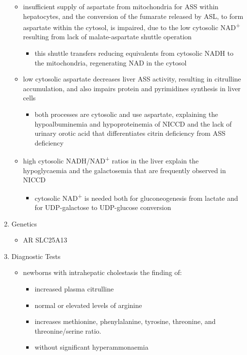 \documentclass[12pt]{scrartcl}
\begin{document}
\begin{center}
\begin{center}
\begin{enumerate}
\begin{itemize}
\item insufficient supply of aspartate from mitochondria for ASS within
hepatocytes, and the conversion of the fumarate released by ASL, to
form aspartate within the cytosol, is impaired, due to the low
cytosolic NAD\textsuperscript{+} resulting from lack of malate-aspartate shuttle
operation
\begin{itemize}
\item this shuttle transfers reducing equivalents from cytosolic NADH
to the mitochondria, regenerating NAD in the cytosol
\end{itemize}
\item low cytosolic aspartate decreases liver ASS activity, resulting in
citrulline accumulation, and also impairs protein and pyrimidines
synthesis in liver cells
\begin{itemize}
\item both processes are cytosolic and use aspartate, explaining the
hypoalbuminemia and hypoproteinemia of NICCD and the lack of
urinary orotic acid that differentiates citrin deficiency from
ASS deficiency
\end{itemize}
\item high cytosolic NADH/NAD\textsuperscript{+} ratios in the liver explain the
hypoglycaemia and the galactosemia that are frequently observed in
NICCD
\begin{itemize}
\item cytosolic NAD\textsuperscript{+} is needed both for gluconeogenesis from lactate and
for UDP-galactose to UDP-glucose conversion
\end{itemize}
\end{itemize}

\item Genetics
\label{sec:orgb9a47e4}
\begin{itemize}
\item AR SLC25A13
\end{itemize}

\item Diagnostic Tests
\label{sec:orgc0ecf02}
\begin{itemize}
\item newborns with intrahepatic cholestasis the finding of:
\begin{itemize}
\item increased plasma citrulline
\item normal or elevated levels of arginine
\item increases methionine, phenylalanine, tyrosine, threonine, and threonine/serine ratio.
\item without significant hyperammonaemia


\end{itemize}
\end{itemize}
\end{enumerate}
\end{center}
\end{center}
\end{document}
